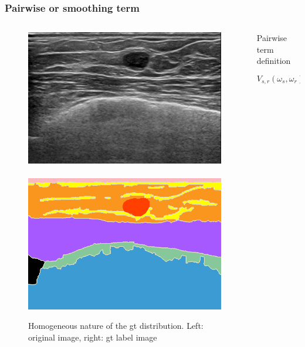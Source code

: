
\begin{frame}\frametitle{Pairwise or smoothing term}
\vspace{-20pt}
\begin{columns}
\begin{column}{.6\textwidth}
\begin{figure}[htbp]
\centering
\includegraphics[width=.5\textwidth]{000023}~
\includegraphics[width=.5\textwidth]{000023gt}
\caption{Homogeneous nature of the \ac{gt} distribution. Left: original image, right: \ac{gt} label image }
\end{figure}
\end{column}
\begin{column}{.4\textwidth}
\begin{block}{Pairwise term definition}\scriptsize
\begin{equation*}
V_{s,r}(\omega_s,\omega_r) = 
\begin{cases}
    \beta, & \text{if } \omega_s \ne \omega_r\\
    0,              & \text{otherwise}
\end{cases}
\label{eq:mrfequation}
\end{equation*}
\vspace{8pt}
\end{block}

\end{column}
\end{columns}
\end{frame}
